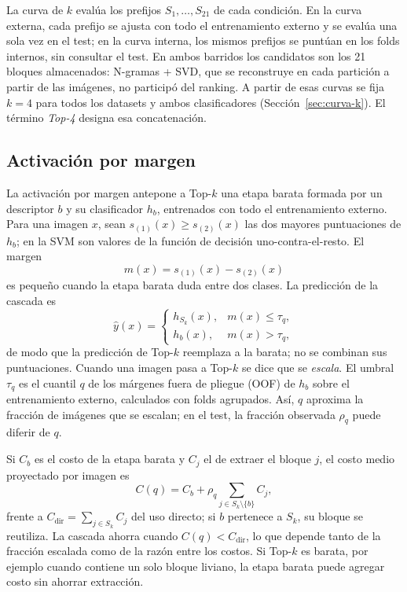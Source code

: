 \documentclass[a4paper,fleqn]{cas-sc}
\begin{document}
La curva de $k$ evalúa los prefijos $S_1,\ldots,S_{21}$ de cada condición. En la curva externa, cada prefijo se ajusta con todo el entrenamiento externo y se evalúa una sola vez en el test; en la curva interna, los mismos prefijos se puntúan en los folds internos, sin consultar el test. En ambos barridos los candidatos son los 21 bloques almacenados: N-gramas + SVD, que se reconstruye en cada partición a partir de las imágenes, no participó del ranking. A partir de esas curvas se fija $k=4$ para todos los datasets y ambos clasificadores (Sección~\ref{sec:curva-k}). El término \emph{Top-4} designa esa concatenación.

\subsection{Activación por margen}\label{sec:margen}

La activación por margen antepone a Top-$k$ una etapa barata formada por un descriptor $b$ y su clasificador $h_b$, entrenados con todo el entrenamiento externo. Para una imagen $x$, sean $s_{(1)}(x)\geq s_{(2)}(x)$ las dos mayores puntuaciones de $h_b$; en la SVM son valores de la función de decisión uno-contra-el-resto. El margen
\begin{equation}
 m(x)=s_{(1)}(x)-s_{(2)}(x)
 \label{eq:margen}
\end{equation}
es pequeño cuando la etapa barata duda entre dos clases. La predicción de la cascada es
\begin{equation}
 \hat{y}(x)=
 \begin{cases}
 h_{S_k}(x), & m(x)\leq\tau_q,\\
 h_b(x), & m(x)>\tau_q,
 \end{cases}
 \label{eq:cascada}
\end{equation}
de modo que la predicción de Top-$k$ reemplaza a la barata; no se combinan sus puntuaciones. Cuando una imagen pasa a Top-$k$ se dice que se \emph{escala}. El umbral $\tau_q$ es el cuantil $q$ de los márgenes fuera de pliegue (OOF) de $h_b$ sobre el entrenamiento externo, calculados con folds agrupados. Así, $q$ aproxima la fracción de imágenes que se escalan; en el test, la fracción observada $\rho_q$ puede diferir de $q$.

Si $C_b$ es el costo de la etapa barata y $C_j$ el de extraer el bloque $j$, el costo medio proyectado por imagen es
\begin{equation}
 C(q)=C_b+\rho_q\sum_{j\in S_k\setminus\{b\}}C_j ,
 \label{eq:costo}
\end{equation}
frente a $C_{\mathrm{dir}}=\sum_{j\in S_k}C_j$ del uso directo; si $b$ pertenece a $S_k$, su bloque se reutiliza. La cascada ahorra cuando $C(q)<C_{\mathrm{dir}}$, lo que depende tanto de la fracción escalada como de la razón entre los costos. Si Top-$k$ es barata, por ejemplo cuando contiene un solo bloque liviano, la etapa barata puede agregar costo sin ahorrar extracción.
\end{document}

